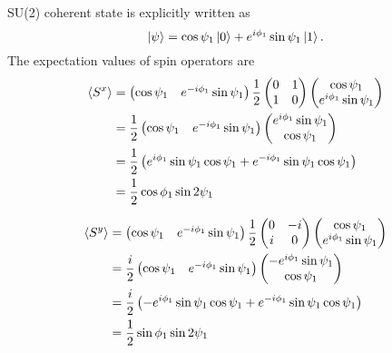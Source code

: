 \documentclass[11pt, aps, longbibliography]{article}
\begin{document}
SU(2) coherent state is explicitly written as
\begin{equation}
    \ket{\psi} = \cos \psi_1\ket{0} + e^{i\phi_1}\sin \psi_1\ket{1}.
\end{equation}
The expectation values of spin operators are 
\begin{align}
    \expval{S^x} &= \begin{pmatrix}\cos \psi_1 & e^{-i\phi_1}\sin \psi_1\end{pmatrix}\frac{1}{2}\begin{pmatrix}0 & 1 \\ 1 & 0 \end{pmatrix} \begin{pmatrix}\cos \psi_1 \\ e^{i\phi_1}\sin \psi_1\end{pmatrix} \\
    &= \frac{1}{2}\begin{pmatrix}\cos \psi_1 & e^{-i\phi_1}\sin \psi_1\end{pmatrix} \begin{pmatrix}e^{i\phi_1}\sin \psi_1 \\ \cos \psi_1 \end{pmatrix} \\
    &= \frac{1}{2}\left( e^{i\phi_1}\sin \psi_1 \cos \psi_1 + e^{-i\phi_1}\sin \psi_1 \cos \psi_1 \right) \\
    &= \frac{1}{2}\cos \phi_1 \sin 2\psi_1\label{eq:SU2-Sx}
\end{align}

\begin{align}
    \expval{S^y} &= \begin{pmatrix}\cos \psi_1 & e^{-i\phi_1}\sin \psi_1\end{pmatrix}\frac{1}{2}\begin{pmatrix}0 & -i \\ i & 0 \end{pmatrix} \begin{pmatrix}\cos \psi_1 \\ e^{i\phi_1}\sin \psi_1\end{pmatrix} \\
    &= \frac{i}{2}\begin{pmatrix}\cos \psi_1 & e^{-i\phi_1}\sin \psi_1\end{pmatrix} \begin{pmatrix}-e^{i\phi_1}\sin \psi_1 \\ \cos \psi_1 \end{pmatrix} \\
    &= \frac{i}{2}\left(-e^{i\phi_1}\sin \psi_1 \cos \psi_1 + e^{-i\phi_1}\sin \psi_1 \cos \psi_1 \right) \\
    &= \frac{1}{2}\sin \phi_1 \sin 2\psi_1\label{eq:SU2-Sy}
\end{align}
\end{document}

